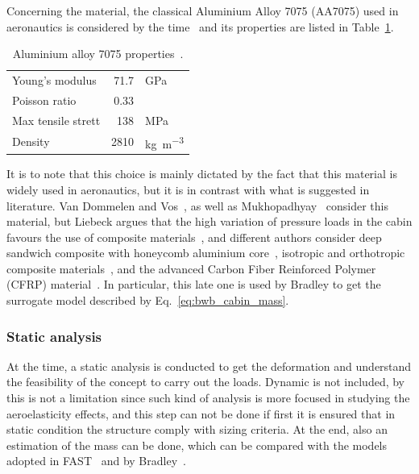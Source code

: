 Concerning the material, the classical Aluminium Alloy 7075 (AA7075) used in aeronautics is considered by the time~\cite{bib:megson} and its properties are listed in Table~\ref{tab:aa7075_properties}.
\begin{table}[!h]
	\centering
	\begin{tabular}{l r l}
		\hline
		Young's modulus & 71.7 & \si{\giga\pascal} \\
		Poisson ratio & 0.33 & \\
		Max tensile strett & 138 & \si{\mega\pascal} \\
		Density & 2810 & \si{\kilogram\per\cubic\meter} \\
		\hline
	\end{tabular}
	\caption{Aluminium alloy 7075 properties~\cite{bib:megson}.}
	\label{tab:aa7075_properties}
\end{table}
It is to note that this choice is mainly dictated by the fact that this material is widely used in aeronautics, but it is in contrast with what is suggested in literature. 
Van Dommelen and Vos~\cite{bib:van_dommelen}, as well as Mukhopadhyay~\cite{bib:mukhopadhayay_2005} consider this material, but Liebeck argues that the high variation of pressure loads in the cabin favours the use of composite materials~\cite{bib:liebeck_1998}, and different authors consider deep sandwich composite with honeycomb aluminium core~\cite{bib:mukhopadhyay_2007}, isotropic and orthotropic composite materials~\cite{bib:mukhopadhyay_1996, bib:mukhopadhayay_2004}, and the advanced Carbon Fiber Reinforced Polymer (CFRP) material~\cite{bib:bradley_bwb}. 
In particular, this late one is used by Bradley to get the surrogate model described by Eq.~\eqref{eq:bwb_cabin_mass}.

\subsubsection{Static analysis}
\label{subsubsec:chap4_bwb_structure_static_analysis}

At the time, a static analysis is conducted to get the deformation and understand the feasibility of the concept to carry out the loads. 
Dynamic is not included, by this is not a limitation since such kind of analysis is more focused in studying the aeroelasticity effects, and this step can not be done if first it is ensured that in static condition the structure comply with sizing criteria. 
At the end, also an estimation of the mass can be done, which can be compared with the models adopted in FAST~\cite{bib:airbus_notes} and by Bradley~\cite{bib:bradley_bwb}.

